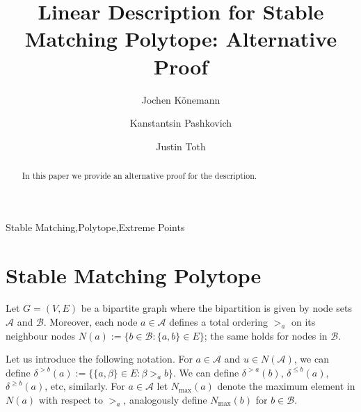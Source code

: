 \documentclass[preprint]{elsarticle}
\begin{document}
\begin{frontmatter}



\title{Linear Description for Stable Matching Polytope: Alternative Proof}
\author[co]{Jochen K\"{o}nemann}
\author[co]{Kanstantsin Pashkovich}
\author[co]{Justin Toth}
\address[co]{Department of Combinatorics and Optimization, University of Waterloo, Canada}


\begin{abstract}
In this paper we provide an alternative proof for the description.
\end{abstract}
\begin{keyword}
Stable Matching\sep Polytope\sep Extreme Points
\end{keyword}
\end{frontmatter}
\section{Stable Matching Polytope}

Let $G = (V, E)$ be a bipartite graph  where the bipartition is given by node sets $\mathcal{A}$ and $\mathcal{B}$. Moreover, each node $a\in\mathcal{A}$ defines a total ordering $>_a$ on its neighbour nodes $N(a):=\{b \in\mathcal{B}: \{a,b\}\in E\}$;  the same holds for nodes in $\mathcal{B}$.

Let us introduce the following notation. For $a\in \mathcal{A}$ and $u \in N(\mathcal{A})$, we can define $\delta^{>b}(a):=\{ \{a,\beta\}\in E: \beta>_a b \}$. We can define $\delta^{>a}(b)$, $\delta^{\leq b}(a)$, $\delta^{\geq b}(a)$, etc, similarly. For $a\in \mathcal{A}$ let $N_{\max}(a)$ denote the maximum element in $N(a)$ with respect to $>_a$, analogously define $N_{\max}(b)$ for $b\in\mathcal{B}$. 
\end{document}
